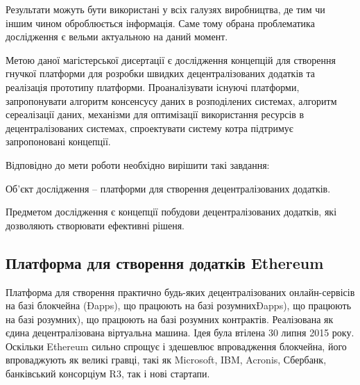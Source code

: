 \documentclass{lib/styles/default-style}
\begin{document}
    Результати можуть бути використані у всіх галузях виробництва, де тим чи іншим чином оброблюється інформація.
    Саме тому обрана проблематика дослідження є вельми актуальною на даний момент.

    Метою даної магістерської дисертації є дослідження концепцій для створення гнучкої платформи для розробки швидких децентралізованих додатків
    та реалізація прототипу платформи. Проаналізувати існуючі платформи, запропонувати алгоритм консенсусу  даних  в  розподілених  системах,
    алгоритм сереалізації даних, механізми для оптимізації використання ресурсів в децентралізованих системах,
    спроектувати  систему  котра  підтримує запропоновані концепції.

    Відповідно до мети роботи необхідно вирішити такі завдання:

    Об'єкт дослідження – платформи для створення децентралізованих додатків.

    Предметом дослідження є концепції побудови децентралізованих додатків, які дозволяють створювати ефективні рішеня.


\subsection{Платформа для створення додатків Ethereum}

    Платформа для створення практично будь-яких децентралізованих
    онлайн-сервісів на базі блокчейна (Đapps), що працюють на базі розумнихĐapps), що працюють на базі розумних), що працюють на базі розумних
    контрактів. Реалізована як єдина децентралізована віртуальна машина. Ідея була
    втілена 30 липня 2015 року. Оскільки Ethereum сильно спрощує і здешевлює
    впровадження блокчейна, його впроваджують як великі гравці, такі як Microsoft, IBM, Acronis,
    Сбербанк, банківський консорціум R3, так і нові стартапи.
\end{document}
